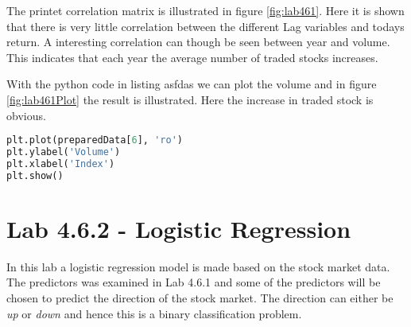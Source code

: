 The printet correlation matrix is illustrated in figure \ref{fig:lab461}. Here it is shown that there is very little correlation between the different Lag variables and todays return. A interesting correlation can though be seen between year and volume. This indicates that each year the average number of traded stocks increases. 

\FloatBarrier

With the python code in listing asfdas we can plot the volume and in figure \ref{fig:lab461Plot} the result is illustrated. Here the increase in traded stock is obvious.
\begin{lstlisting}[language=Python, caption=print correlation matrix]
plt.plot(preparedData[6], 'ro')
plt.ylabel('Volume')
plt.xlabel('Index')
plt.show()
\end{lstlisting}


\section{Lab 4.6.2 - Logistic Regression}
In this lab a logistic regression model is made based on the stock market data. The predictors was examined in Lab 4.6.1 and some of the predictors will be chosen to predict the direction of the stock market. The direction can either be \emph{up} or \emph{down} and hence this is a binary classification problem.